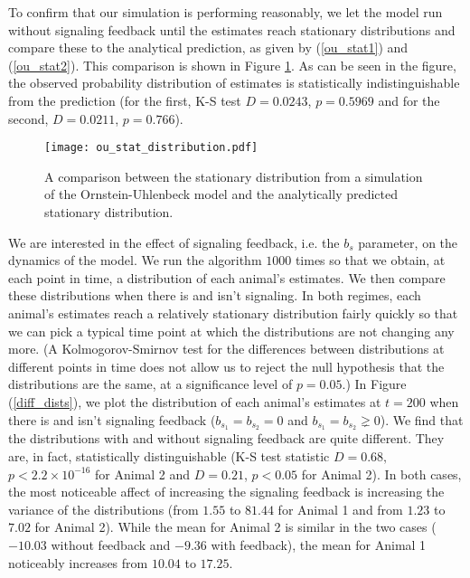 \documentclass{article}
\begin{document}
To confirm that our simulation is performing reasonably, we let the model run without signaling feedback until the estimates reach stationary distributions and compare these to the analytical prediction, as given by (\ref{ou_stat1}) and (\ref{ou_stat2}).  This comparison is shown in Figure \ref{ou_stat_dist}.  As can be seen in the figure, the observed probability distribution of estimates is statistically indistinguishable from the prediction (for the first, K-S test $D=0.0243$, $p=0.5969$ and for the second, $D=0.0211$, $p=0.766$).

\begin{figure}
\begin{center}
\texttt{[image: ou\_stat\_distribution.pdf]} \end{center}
\caption{\label{ou_stat_dist} A comparison between the stationary distribution from a simulation of the Ornstein-Uhlenbeck model and the analytically predicted stationary distribution.}
\end{figure}

We are interested in the effect of signaling feedback, i.e. the $b_s$ parameter, on the dynamics of the model.  We run the algorithm $1000$ times so that we obtain, at each point in time, a distribution of each animal's estimates.  We then compare these distributions when there is and isn't signaling.  In both regimes, each animal's estimates reach a relatively stationary distribution fairly quickly so that we can pick a typical time point at which the distributions are not changing any more.  (A Kolmogorov-Smirnov test for the differences between distributions at different points in time does not allow us to reject the null hypothesis that the distributions are the same, at a significance level of $p=0.05$.)  In Figure (\ref{diff_dists}), we plot the distribution of each animal's estimates at $t=200$ when there is and isn't signaling feedback ($b_{s_1}=b_{s_2}=0$ and $b_{s_1}=b_{s_2}\gneq 0$).  We find that the distributions with and without signaling feedback are quite different.   They are, in fact, statistically distinguishable (K-S test statistic $D=0.68,$ $p<2.2\times 10^{-16}$ for Animal 2 and $D=0.21$, $p<0.05$ for Animal 2).  In both cases, the most noticeable affect of increasing the signaling feedback is increasing the variance of the distributions (from $1.55$ to $81.44$ for Animal 1 and from $1.23$ to $7.02$ for Animal 2).  While the mean for Animal 2 is similar in the two cases ($-10.03$ without feedback and $-9.36$ with feedback), the mean for Animal 1 noticeably increases from $10.04$ to $17.25$.
\end{document}
